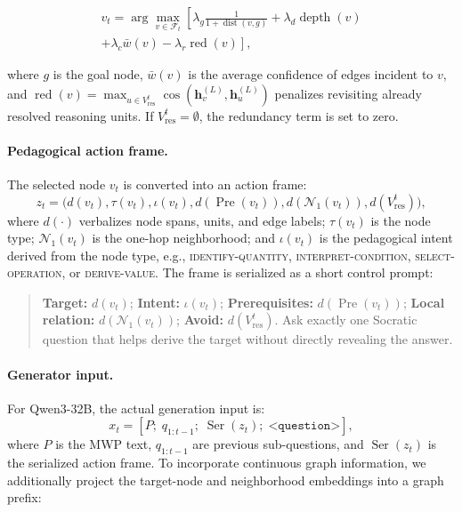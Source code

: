 \documentclass[sigconf, anonymous, review, screen]{acmart}
\begin{document}
\begin{equation}
\begin{split}
v_t = \arg\max_{v\in\mathcal{F}_t} \left[
\lambda_g \frac{1}{1+\operatorname{dist}(v,g)}
+ \lambda_d \operatorname{depth}(v) \right. \\
\left. + \lambda_c \bar{w}(v)
- \lambda_r \operatorname{red}(v) \right],
\end{split}
\label{eq:node_selection}
\end{equation}

where $g$ is the goal node, $\bar{w}(v)$ is the average confidence of edges incident to $v$, and
$\operatorname{red}(v)=\max_{u\in V^t_{\mathrm{res}}}\cos(\mathbf{h}^{(L)}_v,\mathbf{h}^{(L)}_u)$
penalizes revisiting already resolved reasoning units. If $V^t_{\mathrm{res}}=\emptyset$, the redundancy term is set to zero.

\paragraph{Pedagogical action frame.}
The selected node $v_t$ is converted into an action frame:
\begin{equation}
z_t =
\big(
d(v_t),\tau(v_t),\iota(v_t),
d(\operatorname{Pre}(v_t)),
d(\mathcal{N}_1(v_t)),
d(V^t_{\mathrm{res}})
\big),
\label{eq:action_frame}
\end{equation}
where $d(\cdot)$ verbalizes node spans, units, and edge labels; $\tau(v_t)$ is the node type; $\mathcal{N}_1(v_t)$ is the one-hop neighborhood; and $\iota(v_t)$ is the pedagogical intent derived from the node type, e.g., \textsc{identify-quantity}, \textsc{interpret-condition}, \textsc{select-operation}, or \textsc{derive-value}. The frame is serialized as a short control prompt:
\begin{quote}
\scriptsize
\textbf{Target:} $d(v_t)$;
\textbf{Intent:} $\iota(v_t)$;
\textbf{Prerequisites:} $d(\operatorname{Pre}(v_t))$;
\textbf{Local relation:} $d(\mathcal{N}_1(v_t))$;
\textbf{Avoid:} $d(V^t_{\mathrm{res}})$.
Ask exactly one Socratic question that helps derive the target without directly revealing the answer.
\end{quote}

\paragraph{Generator input.}
For Qwen3-32B, the actual generation input is:
\begin{equation}
x_t =
[P;\; q_{1:t-1};\; \operatorname{Ser}(z_t);\; \texttt{<question>}],
\end{equation}
where $P$ is the MWP text, $q_{1:t-1}$ are previous sub-questions, and $\operatorname{Ser}(z_t)$ is the serialized action frame. To incorporate continuous graph information, we additionally project the target-node and neighborhood embeddings into a graph prefix:
\end{document}

